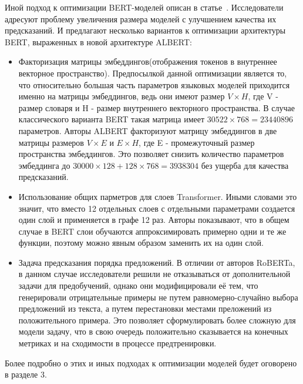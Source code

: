 \par Иной подход к оптимизации BERT-моделей описан в статье~\cite{albert}. Исследователи адресуют проблему увеличения размера моделей с улучшением качества их предсказаний. И предлагают несколько вариантов к оптимизации архитектуры BERT, выраженных в новой архитектуре ALBERT:
\begin{itemize}
    \item Факторизация матрицы эмбеддингов(отображения токенов в внутреннее векторное пространство). Предпосылкой данной оптимизации является то, что относительно большая часть параметров языковых моделей приходится именно на матрицы эмбеддингов, ведь они имеют размер $V \times H$, где V - размер словаря и H - размер внутреннего векторного пространства. В случае классического варианта BERT такая матрица имеет $30522 \times 768 = 23440896$ параметров. Авторы ALBERT факторизуют матрицу эмбеддингов в две матрицы размеров $V \times E$ и $E \times H$, где E - промежуточный размер пространства эмбеддингов. Это позволяет снизить количество параметров эмбеддинга до $30000 \times 128 + 128 \times 768 = 3938304$ без ущерба для качества предсказаний.
    \item Использование общих парметров для слоев Transformer. Иными словами это значит, что вместо 12 отдельных слоев с отдельными параметрами создается один слой и применяется в графе 12 раз. Авторы показывают, что в общем случае в BERT слои обучаются аппроксимировать примерно одни и те же функции, поэтому можно явным образом заменить их на один слой.
    \item Задача предсказания порядка предложений. В отличии от авторов RoBERTa, в данном случае исследователи решили не отказываться от дополнительной задачи для предобучений, однако они модифицировали её тем, что генерировали отрицательные примеры не путем равномерно-случайно выбора предложений из текста, а путем перестановки местами преложений из положительного примера. Это позволяет сформулировать более сложную для модели задачу, что в свою очередь положительно сказывается на конечных метриках и на сходимости в процессе предтренировки.
\end{itemize}

Более подробно о этих и иных подходах к оптимизации моделей будет оговорено в разделе 3.

